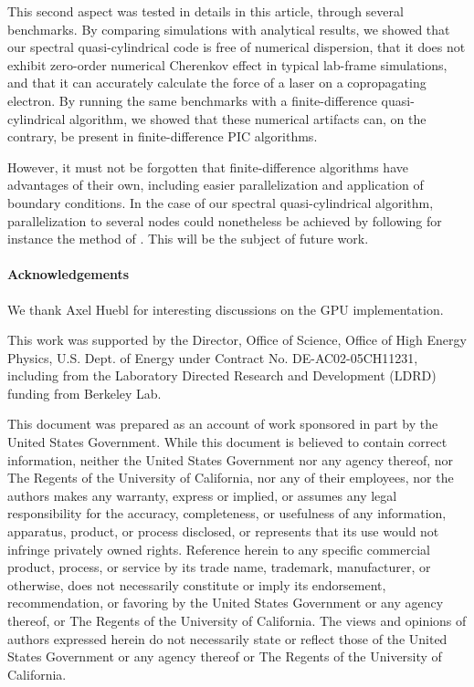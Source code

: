 \documentclass[1p,times,authoryear]{elsarticle}
\begin{document}
This second aspect was tested in details in this article, through
several benchmarks. By comparing simulations with analytical results, 
we showed that our spectral quasi-cylindrical code is free of
numerical dispersion, that it does not exhibit zero-order numerical Cherenkov
effect in typical lab-frame
simulations, and that it can accurately calculate the force of a
laser on a copropagating electron. By running the
same benchmarks with a finite-difference quasi-cylindrical algorithm, we showed that
these numerical artifacts can, on the contrary, be present in
finite-difference PIC algorithms. 

However, it must not be forgotten that
finite-difference algorithms have advantages of their own, including
easier parallelization and application of boundary conditions. In the
case of our spectral quasi-cylindrical algorithm, parallelization to
several nodes could nonetheless be achieved by following for instance the
method of \citep{VayJCP2013}. This will be the subject of future work. 

\paragraph{Acknowledgements}

We thank Axel Huebl for interesting discussions on the GPU implementation.

This work was supported by the Director, Office of Science, Office of High Energy Physics, U.S. Dept. of Energy under Contract No. DE-AC02-05CH11231, including from the Laboratory Directed Research and Development (LDRD) funding from Berkeley Lab.

This document was prepared as an account of work sponsored in part by the United States Government. While this document is believed to contain correct information, neither the United States Government nor any agency thereof, nor The Regents of the University of California, nor any of their employees, nor the authors makes any warranty, express or implied, or assumes any legal responsibility for the accuracy, completeness, or usefulness of any information, apparatus, product, or process disclosed, or represents that its use would not infringe privately owned rights. Reference herein to any specific commercial product, process, or service by its trade name, trademark, manufacturer, or otherwise, does not necessarily constitute or imply its endorsement, recommendation, or favoring by the United States Government or any agency thereof, or The Regents of the University of California. The views and opinions of authors expressed herein do not necessarily state or reflect those of the United States Government or any agency thereof or The Regents of the University of California.

\newpage
\appendix





\end{document}

